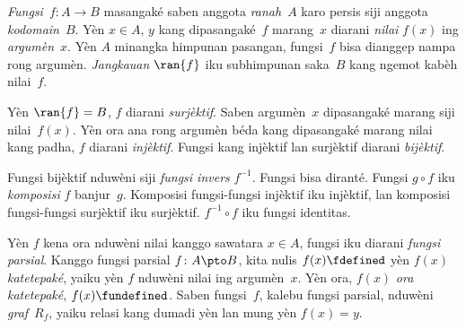 \emph{Fungsi}~$f\colon A\to B$ masangaké saben anggota
\emph{ranah}~$A$ karo persis siji anggota \emph{kodomain}~$B$.
Yèn $x\in A$, $y$ kang dipasangaké~$f$ marang~$x$ diarani
\emph{nilai} $f(x)$ ing \emph{argumèn}~$x$. Yèn $A$ minangka
himpunan pasangan, fungsi~$f$ bisa dianggep nampa rong argumèn.
\emph{Jangkauan} $\ran{f}$ iku subhimpunan saka~$B$ kang
ngemot kabèh nilai~$f$.

Yèn $\ran{f}=B$, $f$ diarani \emph{surjèktif}. Saben
argumèn~$x$ dipasangaké marang siji nilai~$f(x)$. Yèn ora ana
rong argumèn béda kang dipasangaké marang nilai kang padha,
$f$ diarani \emph{injèktif}. Fungsi kang injèktif lan surjèktif
diarani \emph{bijèktif}.

Fungsi bijèktif nduwèni siji \emph{fungsi invers} $f^{-1}$.
Fungsi bisa diranté. Fungsi $g\circ f$ iku \emph{komposisi}
$f$ banjur~$g$. Komposisi fungsi-fungsi injèktif iku injèktif,
lan komposisi fungsi-fungsi surjèktif iku surjèktif.
$f^{-1}\circ f$ iku fungsi identitas.

Yèn $f$ kena ora nduwèni nilai kanggo sawatara $x\in A$,
fungsi iku diarani \emph{fungsi parsial}. Kanggo fungsi
parsial $f\colon A\pto B$, kita nulis $f(x)\fdefined$ yèn
$f(x)$ \emph{katetepaké}, yaiku yèn $f$ nduwèni nilai ing
argumèn~$x$. Yèn ora, $f(x)$ \emph{ora katetepaké},
$f(x)\fundefined$. Saben fungsi~$f$, kalebu fungsi parsial,
nduwèni \emph{graf}~$R_f$, yaiku relasi kang dumadi yèn lan
mung yèn $f(x)=y$.

